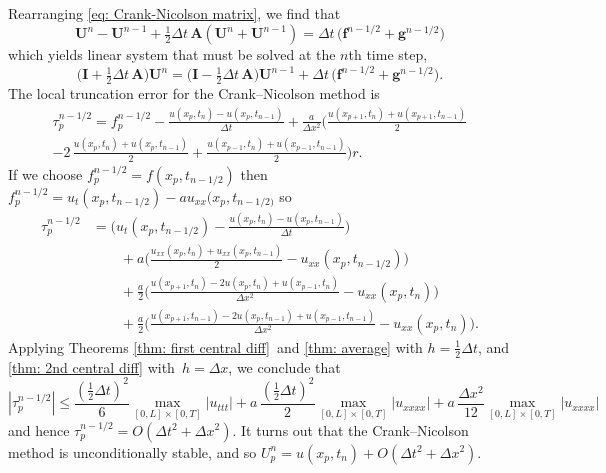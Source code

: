 Rearranging \eqref{eq: Crank-Nicolson matrix}, we find that
\[
\boldsymbol{U}^n-\boldsymbol{U}^{n-1}
    +\tfrac12\Delta t\,\boldsymbol{A}(\boldsymbol{U}^n+\boldsymbol{U}^{n-1})
    =\Delta t\,\bigl(\boldsymbol{f}^{n-1/2}+\boldsymbol{g}^{n-1/2}\bigr)
\]
which yields linear system that must be solved at the $n$th time step,
\[
\bigl(\boldsymbol{I}+\tfrac12\Delta t\,\boldsymbol{A}\bigr)\boldsymbol{U}^n=
\bigl(\boldsymbol{I}-\tfrac12\Delta t\,\boldsymbol{A}\bigr)\boldsymbol{U}^{n-1}
    +\Delta t\,\bigl(\boldsymbol{f}^{n-1/2}+\boldsymbol{g}^{n-1/2}\bigr).
\]
The local truncation error for the Crank--Nicolson method is
\begin{multline*}
\tau^{n-1/2}_p=f^{n-1/2}_p-\frac{u(x_p,t_n)-u(x_p,t_{n-1})}{\Delta t}
    +\frac{a}{\Delta x^2}\biggl(
    \frac{u(x_{p+1},t_n)+u(x_{p+1},t_{n-1})}{2}\\
    -2\,\frac{u(x_p,t_n)+u(x_p,t_{n-1})}{2}
    +\frac{u(x_{p-1},t_n)+u(x_{p-1},t_{n-1})}{2}\biggr)r.
\end{multline*}
If we choose $f^{n-1/2}_p=f(x_p,t_{n-1/2})$ then
$f^{n-1/2}_p=u_t(x_p,t_{n-1/2})-au_{xx}(x_p,t_{n-1/2)}$ so
\begin{align*}
\tau^{n-1/2}_p
&=\biggl(u_t(x_p,t_{n-1/2})-\frac{u(x_p,t_n)-u(x_p,t_{n-1})}{\Delta t}\biggr)\\
    &\qquad{}+a\biggl(\frac{u_{xx}(x_p,t_n)+u_{xx}(x_p,t_{n-1})}{2}
        -u_{xx}(x_p,t_{n-1/2})\biggr)\\
    &\qquad{}+\frac{a}{2}\biggl(
    \frac{u(x_{p+1},t_n)-2u(x_p,t_n)+u(x_{p-1},t_n)}{\Delta x^2}-u_{xx}(x_p,t_n)
    \biggr)\\
    &\qquad{}+\frac{a}{2}\biggl(
    \frac{u(x_{p+1},t_{n-1})-2u(x_p,t_{n-1})+u(x_{p-1},t_{n-1})}{\Delta x^2}
        -u_{xx}(x_p,t_n)\biggr).
\end{align*}
Applying Theorems \ref{thm: first central diff}~and \ref{thm: average} with 
$h=\tfrac12\Delta t$, and \cref{thm: 2nd central diff} with~$h=\Delta 
x$, we conclude that
\[
|\tau^{n-1/2}_p|
    \le\frac{(\tfrac12\Delta t)^2}{6}\max_{[0,L]\times[0,T]}|u_{ttt}| 
    +a\,\frac{(\tfrac12\Delta t)^2}{2}\max_{[0,L]\times[0,T]}|u_{xxxx}|
    +a\,\frac{\Delta x^2}{12}\max_{[0,L]\times[0,T]}|u_{xxxx}|
\]
and hence $\tau^{n-1/2}_p=O(\Delta t^2+\Delta x^2)$.  It turns out that the 
Crank--Nicolson method is unconditionally stable, and so 
$U^n_p=u(x_p,t_n)+O(\Delta t^2+\Delta x^2)$.

